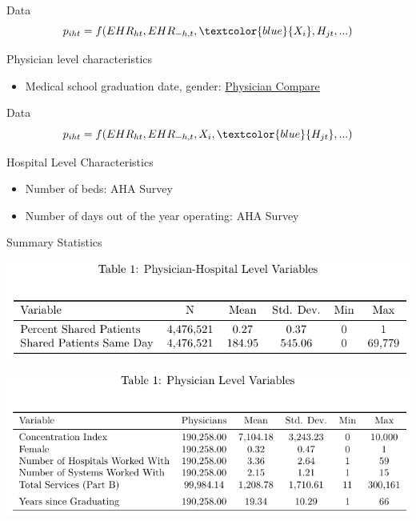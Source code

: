 \documentclass[10pt]{beamer}
\begin{document}
\begin{frame}[noframenumbering]{Data}
\begin{equation*}
    p_{iht}=f(EHR_{ht},EHR_{-h,t},\textcolor{blue}{X_i},H_{jt},...)
\end{equation*}

\vspace{5mm}

Physician level characteristics
\begin{itemize}
    \item Medical school graduation date, gender: \underline{Physician Compare}
\end{itemize}
\end{frame}

\begin{frame}[noframenumbering]{Data}
\begin{equation*}
    p_{iht}=f(EHR_{ht},EHR_{-h,t},X_i,\textcolor{blue}{H_{jt}},...)
\end{equation*}

\vspace{5mm}

Hospital Level Characteristics
\begin{itemize}
    \item Number of beds: AHA Survey
    \item Number of days out of the year operating: AHA Survey
\end{itemize}
\end{frame}

\begin{frame}{Summary Statistics}
\centering

\includegraphics[scale=.8]{Objects/sumstats_pair_table.pdf}

\vspace{3mm}

\includegraphics[scale=.8]{Objects/sumstats_physician_table.pdf}

\end{frame}
\end{document}
